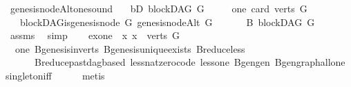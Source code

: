 \begin{isabellebody}
\isanewline
{}\isamarkupfalse%
\ genesis{\isacharunderscore}{\kern0pt}nodeAlt{\isacharunderscore}{\kern0pt}one{\isacharunderscore}{\kern0pt}sound{\isacharcolon}{\kern0pt}\isanewline
\ \ \ bD{\isacharcolon}{\kern0pt}\ {\isachardoublequoteopen}blockDAG\ G{\isachardoublequoteclose}\isanewline
\ \ \ \ \ one{\isacharcolon}{\kern0pt}\ {\isachardoublequoteopen}card\ {\isacharparenleft}{\kern0pt}verts\ G{\isacharparenright}{\kern0pt}\ {\isacharequal}{\kern0pt}\ {}{\isachardoublequoteclose}\isanewline
\ \ \ {\isachardoublequoteopen}blockDAG{\isachardot}{\kern0pt}is{\isacharunderscore}{\kern0pt}genesis{\isacharunderscore}{\kern0pt}node\ G\ {\isacharparenleft}{\kern0pt}genesis{\isacharunderscore}{\kern0pt}nodeAlt\ G{\isacharparenright}{\kern0pt}{\isachardoublequoteclose}\ \isanewline
%
\isadelimproof
%
\endisadelimproof
%
\isatagproof
{}\isamarkupfalse%
\ {\isacharminus}{\kern0pt}\isanewline
\ \ \isamarkupfalse%
\ B{\isacharcolon}{\kern0pt}\ blockDAG\ {\isachardoublequoteopen}G{\isachardoublequoteclose}\ \isamarkupfalse%
\ assms{\isacharparenleft}{\kern0pt}{}{\isacharparenright}{\kern0pt}\ \isamarkupfalse%
\ simp\isanewline
\ \ \isamarkupfalse%
\ exone{\isacharcolon}{\kern0pt}\ {\isachardoublequoteopen}{\isasymexists}{\isacharbang}{\kern0pt}\ x{\isachardot}{\kern0pt}\ x\ {\isasymin}\ {\isacharparenleft}{\kern0pt}verts\ G{\isacharparenright}{\kern0pt}{\isachardoublequoteclose}\isanewline
\ \ \ \ \isamarkupfalse%
\ \ one\ B{\isachardot}{\kern0pt}genesis{\isacharunderscore}{\kern0pt}in{\isacharunderscore}{\kern0pt}verts\ B{\isachardot}{\kern0pt}genesis{\isacharunderscore}{\kern0pt}unique{\isacharunderscore}{\kern0pt}exists\ B{\isachardot}{\kern0pt}reduce{\isacharunderscore}{\kern0pt}less\isanewline
\ \ \ \ \ \ B{\isachardot}{\kern0pt}reduce{\isacharunderscore}{\kern0pt}past{\isacharunderscore}{\kern0pt}dagbased\ less{\isacharunderscore}{\kern0pt}nat{\isacharunderscore}{\kern0pt}zero{\isacharunderscore}{\kern0pt}code\ less{\isacharunderscore}{\kern0pt}one\ B{\isachardot}{\kern0pt}gen{\isacharunderscore}{\kern0pt}gen\ B{\isachardot}{\kern0pt}gen{\isacharunderscore}{\kern0pt}graph{\isacharunderscore}{\kern0pt}all{\isacharunderscore}{\kern0pt}one\ singleton{\isacharunderscore}{\kern0pt}iff\isanewline
\ \ \ \ \isamarkupfalse%
\ {\isacharparenleft}{\kern0pt}metis{\isacharparenright}{\kern0pt}\ \ \isanewline
\ \ \isamarkupfalse%
\ \isamarkupfalse%

\end{isabellebody}
